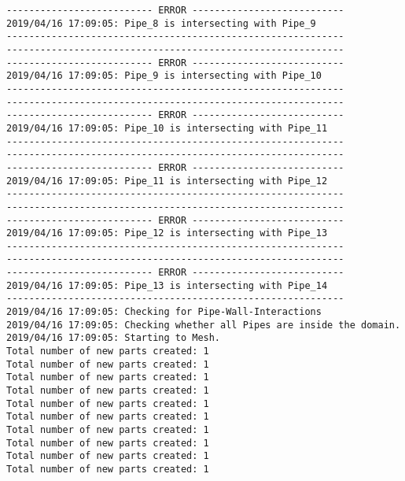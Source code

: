 \documentclass{article}
\begin{document}
{\begin{verbatim}
-------------------------- ERROR ---------------------------
2019/04/16 17:09:05: Pipe_8 is intersecting with Pipe_9
------------------------------------------------------------
------------------------------------------------------------
-------------------------- ERROR ---------------------------
2019/04/16 17:09:05: Pipe_9 is intersecting with Pipe_10
------------------------------------------------------------
------------------------------------------------------------
-------------------------- ERROR ---------------------------
2019/04/16 17:09:05: Pipe_10 is intersecting with Pipe_11
------------------------------------------------------------
------------------------------------------------------------
-------------------------- ERROR ---------------------------
2019/04/16 17:09:05: Pipe_11 is intersecting with Pipe_12
------------------------------------------------------------
------------------------------------------------------------
-------------------------- ERROR ---------------------------
2019/04/16 17:09:05: Pipe_12 is intersecting with Pipe_13
------------------------------------------------------------
------------------------------------------------------------
-------------------------- ERROR ---------------------------
2019/04/16 17:09:05: Pipe_13 is intersecting with Pipe_14
------------------------------------------------------------
2019/04/16 17:09:05: Checking for Pipe-Wall-Interactions
2019/04/16 17:09:05: Checking whether all Pipes are inside the domain.
2019/04/16 17:09:05: Starting to Mesh.
Total number of new parts created: 1
Total number of new parts created: 1
Total number of new parts created: 1
Total number of new parts created: 1
Total number of new parts created: 1
Total number of new parts created: 1
Total number of new parts created: 1
Total number of new parts created: 1
Total number of new parts created: 1
Total number of new parts created: 1
\end{verbatim}
}
\clearpage
\end{document}
